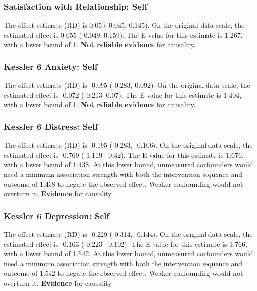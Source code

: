 \documentclass[
  singlecolumn]{article}
\begin{document}
\subsubsection{Satisfaction with Relationship:
Self}\label{satisfaction-with-relationship-self-14}

The effect estimate (RD) is 0.05 (-0.045, 0.145). On the original data
scale, the estimated effect is 0.055 (-0.049, 0.159). The E-value for
this estimate is 1.267, with a lower bound of 1. \textbf{Not reliable
evidence} for causality.

\subsubsection{Kessler 6 Anxiety: Self}\label{kessler-6-anxiety-self-14}

The effect estimate (RD) is -0.095 (-0.283, 0.092). On the original data
scale, the estimated effect is -0.072 (-0.213, 0.07). The E-value for
this estimate is 1.404, with a lower bound of 1. \textbf{Not reliable
evidence} for causality.

\subsubsection{Kessler 6 Distress:
Self}\label{kessler-6-distress-self-14}

The effect estimate (RD) is -0.195 (-0.283, -0.106). On the original
data scale, the estimated effect is -0.769 (-1.119, -0.42). The E-value
for this estimate is 1.676, with a lower bound of 1.438. At this lower
bound, unmeasured confounders would need a minimum association strength
with both the intervention sequence and outcome of 1.438 to negate the
observed effect. Weaker confounding would not overturn it.
\textbf{Evidence} for causality.

\subsubsection{Kessler 6 Depression:
Self}\label{kessler-6-depression-self-14}

The effect estimate (RD) is -0.229 (-0.314, -0.144). On the original
data scale, the estimated effect is -0.163 (-0.223, -0.102). The E-value
for this estimate is 1.766, with a lower bound of 1.542. At this lower
bound, unmeasured confounders would need a minimum association strength
with both the intervention sequence and outcome of 1.542 to negate the
observed effect. Weaker confounding would not overturn it.
\textbf{Evidence} for causality.
\end{document}
